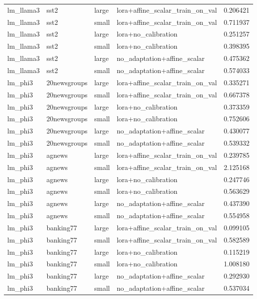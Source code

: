 \begin{tabular}{llllr}
lm_llama3 & sst2 & large & lora+affine_scalar_train_on_val & 0.206421 \\
lm_llama3 & sst2 & small & lora+affine_scalar_train_on_val & 0.711937 \\
lm_llama3 & sst2 & large & lora+no_calibration & 0.251257 \\
lm_llama3 & sst2 & small & lora+no_calibration & 0.398395 \\
lm_llama3 & sst2 & large & no_adaptation+affine_scalar & 0.475362 \\
lm_llama3 & sst2 & small & no_adaptation+affine_scalar & 0.574033 \\
lm_phi3 & 20newsgroups & large & lora+affine_scalar_train_on_val & 0.335271 \\
lm_phi3 & 20newsgroups & small & lora+affine_scalar_train_on_val & 0.667378 \\
lm_phi3 & 20newsgroups & large & lora+no_calibration & 0.373359 \\
lm_phi3 & 20newsgroups & small & lora+no_calibration & 0.752606 \\
lm_phi3 & 20newsgroups & large & no_adaptation+affine_scalar & 0.430077 \\
lm_phi3 & 20newsgroups & small & no_adaptation+affine_scalar & 0.539332 \\
lm_phi3 & agnews & large & lora+affine_scalar_train_on_val & 0.239785 \\
lm_phi3 & agnews & small & lora+affine_scalar_train_on_val & 2.125168 \\
lm_phi3 & agnews & large & lora+no_calibration & 0.247746 \\
lm_phi3 & agnews & small & lora+no_calibration & 0.563629 \\
lm_phi3 & agnews & large & no_adaptation+affine_scalar & 0.437390 \\
lm_phi3 & agnews & small & no_adaptation+affine_scalar & 0.554958 \\
lm_phi3 & banking77 & large & lora+affine_scalar_train_on_val & 0.099105 \\
lm_phi3 & banking77 & small & lora+affine_scalar_train_on_val & 0.582589 \\
lm_phi3 & banking77 & large & lora+no_calibration & 0.115219 \\
lm_phi3 & banking77 & small & lora+no_calibration & 1.008180 \\
lm_phi3 & banking77 & large & no_adaptation+affine_scalar & 0.292930 \\
lm_phi3 & banking77 & small & no_adaptation+affine_scalar & 0.537034 \\

\end{tabular}
